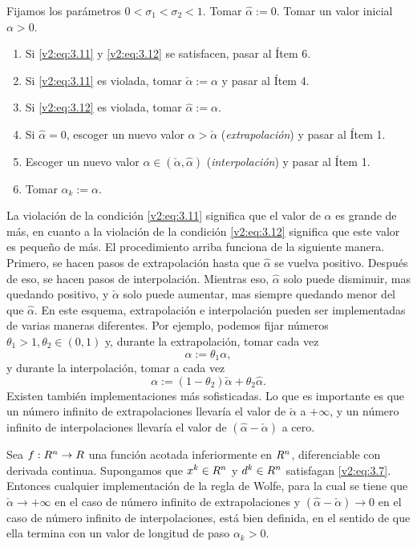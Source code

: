 \begin{algorithm}\label{v2:alg:wolfe}
    Fijamos los parámetros $0 < \sigma_1 < \sigma_2 < 1$. Tomar $\hat{\alpha} := 0$. Tomar un valor inicial $\alpha > 0$.
\begin{enumerate}
    \item Si \eqref{v2:eq:3.11} y \eqref{v2:eq:3.12} se satisfacen, pasar al Ítem 6.
    \item Si \eqref{v2:eq:3.11} es violada, tomar $\check{\alpha} := \alpha$ y pasar al Ítem 4.
    \item Si \eqref{v2:eq:3.12} es violada, tomar $\hat{\alpha} := \alpha$.
    \item Si $\hat{\alpha} = 0$, escoger un nuevo valor $\alpha > \check{\alpha}$ (\textit{extrapolación}) y pasar al Ítem 1.
    \item Escoger un nuevo valor $\alpha \in (\check{\alpha}, \hat{\alpha})$ (\textit{interpolación}) y pasar al Ítem 1.
    \item Tomar $\alpha_k := \alpha$.
\end{enumerate}
\end{algorithm}


La violación de la condición \eqref{v2:eq:3.11} significa que el valor de $\alpha$ es grande de más, en cuanto a la violación de la condición \eqref{v2:eq:3.12} significa que este valor es pequeño de más. El procedimiento arriba funciona de la siguiente manera. Primero, se hacen pasos de extrapolación hasta que $\hat{\alpha}$ se vuelva positivo. Después de eso, se hacen pasos de interpolación. Mientras eso, $\hat{\alpha}$ solo puede disminuir, mas quedando positivo, y $\check{\alpha}$ solo puede aumentar, mas siempre quedando menor del que $\hat{\alpha}$.
En este esquema, extrapolación e interpolación pueden ser implementadas de varias maneras diferentes. Por ejemplo, podemos fijar números $\theta_1 > 1, \theta_2 \in (0, 1)$ y, durante la extrapolación, tomar cada vez
\[
    \alpha := \theta_1 \alpha,
\]
y durante la interpolación, tomar a cada vez
\[
    \alpha := (1 - \theta_2)\check{\alpha} + \theta_2 \hat{\alpha}.
\]
Existen también implementaciones más sofisticadas.
Lo que es importante es que un número infinito de extrapolaciones llevaría el valor de $\check{\alpha}$ a $+\infty$, y un número infinito de interpolaciones llevaría el valor de $(\hat{\alpha} - \check{\alpha})$ a cero.

\begin{lemma}\label{v2:lem:3.1.4}
    Sea $f : R^n \to R$ una función acotada inferiormente en $R^n$, diferenciable con derivada continua. Supongamos que $x^k \in R^n$ y $d^k \in R^n$ satisfagan \eqref{v2:eq:3.7}.
    Entonces cualquier implementación de la regla de Wolfe, para la cual se tiene que $\check{\alpha} \to +\infty$ en el caso de número infinito de extrapolaciones y $(\hat{\alpha} - \check{\alpha}) \to 0$ en el caso de número infinito de interpolaciones, está bien definida, en el sentido de que ella termina con un valor de longitud de paso $\alpha_k > 0$.
\end{lemma}

